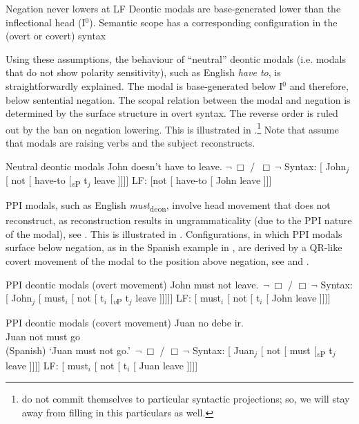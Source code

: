 \documentclass[output=paper,
modfonts,
newtxmath,colorlinks,citecolor=brown
]{langscibook}
\begin{document}
	\ea \label{assume} \ea Negation never lowers at LF 
        \ex Deontic modals are base-generated lower than the inflectional head (I$^0$).
        \ex Semantic scope has a corresponding configuration in the (overt or covert) syntax
        \z \z 

\noindent Using these assumptions, the behaviour of ``neutral'' deontic modals (i.e. modals that do not show polarity sensitivity), such as English \textit{have to}, is straightforwardly explained. The modal is base-generated below I$^0$ and therefore,  below sentential negation. The scopal relation between the modal and negation is determined by the surface structure in  overt syntax. The reverse order is ruled out by the ban on negation lowering. This is illustrated in .\footnote{\cite{iatzei10,iatzei13} do not commit themselves to particular syntactic projections; so, we will stay away from filling in this particulars as well.
}
Note that \cite{iatzei13} assume that modals are raising verbs and the subject reconstructs. 

\ea	Neutral deontic modals \label{neut} 
    \ea John doesn't have to leave. \hfill {} $\neg \ \Box$ /  $\,\Box\ \neg$
	\ex Syntax: [ John$_j$ [ not [ have-to  [\textsubscript{\textit{v}P} t$_j$ leave ]]]]
	\ex LF: [not [ have-to [ John leave ]]]
   \z \z 

\noindent PPI modals, such as English \textit{must}\textsubscript{deon}, involve head movement that does not reconstruct, as reconstruction results in ungrammaticality (due to the PPI nature of the modal), see \cite[549]{iatzei13}.  This is illustrated in . Configurations, in which PPI modals surface below negation, as in the Spanish example in , are derived by a QR-like covert movement of the modal to the position above negation, see  and . 

	\ea PPI deontic modals (overt movement) \label{overtmv}
		\ea John must not leave. \hfill {} $\,\neg \ \Box$ /  $\Box\ \neg$
		\ex Syntax: [ John$_j$ [ must$_i$ [ not [ t$_i$ [\textsubscript{\textit{v}P} t$_j$ leave ]]]]]
       	\ex LF: [ must$_i$ [ not [ t$_i$ [ John leave ]]]]
		\z \z 

	\ea PPI deontic modals (covert movement) \label{debe}
    	\ea \gll Juan no debe ir. \\ 
    	Juan not must go \\ \hfill (Spanish)
       	\glt `Juan must not go.' \hfill {} $\,\neg \ \Box$ /  $\Box\ \neg$ \label{spaa}
    	\ex Syntax: [ Juan$_j$ [ not [ must [\textsubscript{\textit{v}P} t$_j$ leave ]]]] \label{spab}
      	\ex LF: [ must$_i$ [ not [ t$_i$ [ Juan leave ]]]] \label{spac}
        \z \z 
 
\end{document}
